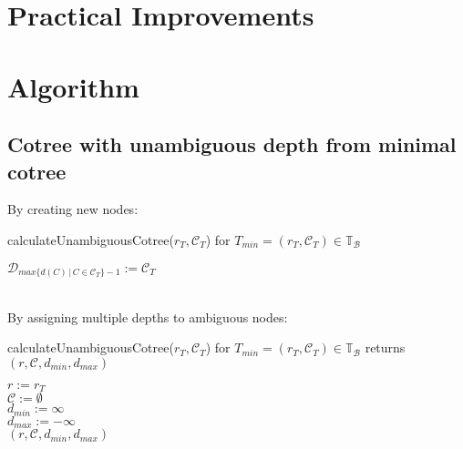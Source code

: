 \documentclass[a4paper,12pt]{article}
\theoremstyle{definition}
\begin{document}
	\section{Practical Improvements}
	\section{Algorithm}
	\subsection{Cotree with unambiguous depth from minimal cotree}
	By creating new nodes:
	\begin{function}
		\caption{calculateUnambiguousCotree($r_T, \mathcal{C}_T$) for $T_{min}=(r_T, \mathcal{C}_T)\in \mathds{T}_{\mathcal{B}}$}
		$\mathcal{D}_{max\{d(C) \,| \, C \in \mathcal{C}_T\} - 1} := \mathcal{C}_T$\\
	\end{function}\\
	By assigning multiple depths to ambiguous nodes:
	\begin{function}
		\caption{calculateUnambiguousCotree($r_T, \mathcal{C}_T$) for $T_{min}=(r_T, \mathcal{C}_T)\in \mathds{T}_{\mathcal{B}}$ returns $(r, \mathcal{C}, d_{min}, d_{max})$}
		$r:=r_T$\\
		$\mathcal{C}:= \emptyset$\\
		$d_{min} := \infty$\\
		$d_{max} :=  - \infty$\\
	\Return $(r, \mathcal{C}, d_{min}, d_{max})$
		
	\end{function}\\
\end{document}
